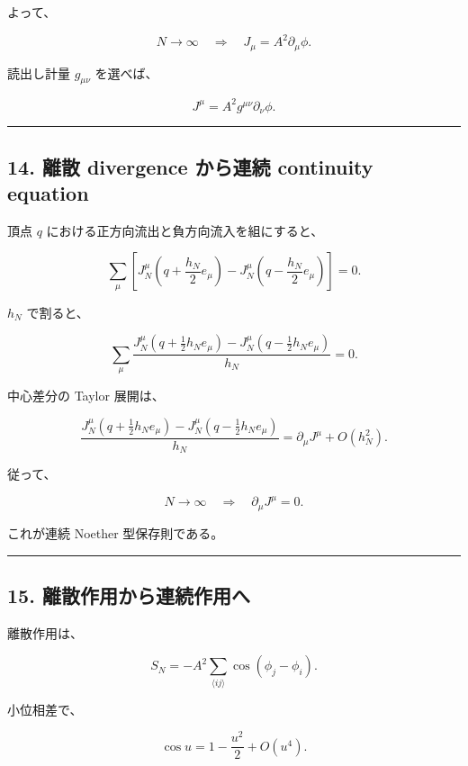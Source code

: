 \documentclass[
  a4paper,
]{ltjsarticle}
\begin{document}
よって、

\[
\boxed{
N\to\infty
\quad\Longrightarrow\quad
J_\mu
=
A^2\partial_\mu\phi.
}
\tag{47}
\]

読出し計量 \(g_{\mu\nu}\) を選べば、

\[
\boxed{
J^\mu
=
A^2g^{\mu\nu}\partial_\nu\phi.
}
\tag{48}
\]

\begin{center}\rule{0.5\linewidth}{0.5pt}\end{center}

\subsection{14. 離散 divergence から連続 continuity
equation}\label{ux96e2ux6563-divergence-ux304bux3089ux9023ux7d9a-continuity-equation}

頂点 \(q\) における正方向流出と負方向流入を組にすると、

\[
\sum_\mu
\left[
J_N^\mu
\left(
q+\frac{h_N}{2}e_\mu
\right)
-
J_N^\mu
\left(
q-\frac{h_N}{2}e_\mu
\right)
\right]
=0.
\tag{49}
\]

\(h_N\) で割ると、

\[
\boxed{
\sum_\mu
\frac{
J_N^\mu(q+\tfrac12h_Ne_\mu)
-
J_N^\mu(q-\tfrac12h_Ne_\mu)
}{
h_N
}
=
0.
}
\tag{50}
\]

中心差分の Taylor 展開は、

\[
\frac{
J_N^\mu(q+\tfrac12h_Ne_\mu)
-
J_N^\mu(q-\tfrac12h_Ne_\mu)
}{
h_N
}
=
\partial_\mu J^\mu
+
O(h_N^2).
\tag{51}
\]

従って、

\[
\boxed{
N\to\infty
\quad\Longrightarrow\quad
\partial_\mu J^\mu=0.
}
\tag{52}
\]

これが連続 Noether 型保存則である。

\begin{center}\rule{0.5\linewidth}{0.5pt}\end{center}

\subsection{15.
離散作用から連続作用へ}\label{ux96e2ux6563ux4f5cux7528ux304bux3089ux9023ux7d9aux4f5cux7528ux3078}

離散作用は、

\[
S_N
=
-A^2
\sum_{\langle ij\rangle}
\cos(\phi_j-\phi_i).
\]

小位相差で、

\[
\cos u
=
1-\frac{u^2}{2}
+
O(u^4).
\tag{53}
\]
\end{document}
